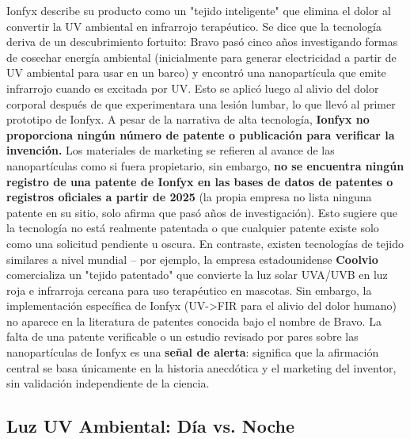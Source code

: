 \documentclass{article}
\begin{document}
Ionfyx describe su producto como un "tejido inteligente" que elimina el dolor al convertir la UV ambiental en infrarrojo terapéutico. Se dice que la tecnología deriva de un descubrimiento fortuito: Bravo pasó cinco años investigando formas de cosechar energía ambiental (inicialmente para generar electricidad a partir de UV ambiental para usar en un barco) y encontró una nanopartícula que emite infrarrojo cuando es excitada por UV. Esto se aplicó luego al alivio del dolor corporal después de que experimentara una lesión lumbar, lo que llevó al primer prototipo de Ionfyx. A pesar de la narrativa de alta tecnología, \textbf{Ionfyx no proporciona ningún número de patente o publicación para verificar la invención.} Los materiales de marketing se refieren al avance de las nanopartículas como si fuera propietario, sin embargo, \textbf{no se encuentra ningún registro de una patente de Ionfyx en las bases de datos de patentes o registros oficiales a partir de 2025} (la propia empresa no lista ninguna patente en su sitio, solo afirma que pasó años de investigación). Esto sugiere que la tecnología no está realmente patentada o que cualquier patente existe solo como una solicitud pendiente u oscura. En contraste, existen tecnologías de tejido similares a nivel mundial – por ejemplo, la empresa estadounidense \textbf{Coolvio} comercializa un "tejido patentado" que convierte la luz solar UVA/UVB en luz roja e infrarroja cercana para uso terapéutico en mascotas. Sin embargo, la implementación específica de Ionfyx (UV->FIR para el alivio del dolor humano) no aparece en la literatura de patentes conocida bajo el nombre de Bravo. La falta de una patente verificable o un estudio revisado por pares sobre las nanopartículas de Ionfyx es una \textbf{señal de alerta}: significa que la afirmación central se basa únicamente en la historia anecdótica y el marketing del inventor, sin validación independiente de la ciencia.

\subsection{Luz UV Ambiental: Día vs. Noche}
\end{document}
